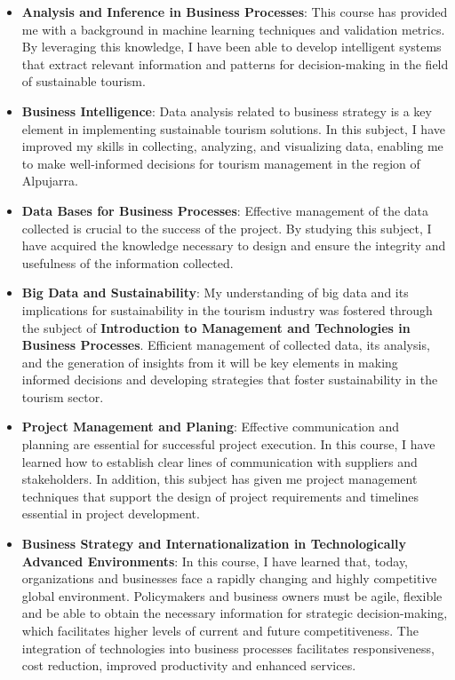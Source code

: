\begin{itemize}
\item \textbf{Analysis and Inference in Business Processes}: This course has provided me with a background in machine learning techniques and validation metrics. By leveraging this knowledge, I have been able to develop intelligent systems that extract relevant information and patterns for decision-making in the field of sustainable tourism. 

\item \textbf{Business Intelligence}: Data analysis related to business strategy is a key element in implementing sustainable tourism solutions. In this subject, I have improved my skills in collecting, analyzing, and visualizing data, enabling me to make well-informed decisions for tourism management in the region of Alpujarra. 

\item \textbf{Data Bases for Business Processes}: Effective management of the data collected is crucial to the success of the project. By studying this subject, I have acquired the knowledge necessary to design and ensure the integrity and usefulness of the information collected.

\item \textbf{Big Data and Sustainability}: My understanding of big data and its implications for sustainability in the tourism industry was fostered through the subject of \textbf{Introduction to Management and Technologies in Business Processes}. Efficient management of collected data, its analysis, and the generation of insights from it will be key elements in making informed decisions and developing strategies that foster sustainability in the tourism sector.

\item \textbf{Project Management and Planing}: Effective communication and planning are essential for successful project execution. In this course, I have learned how to establish clear lines of communication with suppliers and stakeholders. In addition, this subject has given me project management techniques that support the design of project requirements and timelines essential in project development.

\item \textbf{Business Strategy and Internationalization in Technologically Advanced Environments}: In this course, I have learned that, today, organizations and businesses face a rapidly changing and highly competitive global environment. Policymakers and business owners must be agile, flexible and be able to obtain the necessary information for strategic decision-making, which facilitates higher levels of current and future competitiveness. The integration of technologies into business processes facilitates responsiveness, cost reduction, improved productivity and enhanced services.
\end{itemize}

